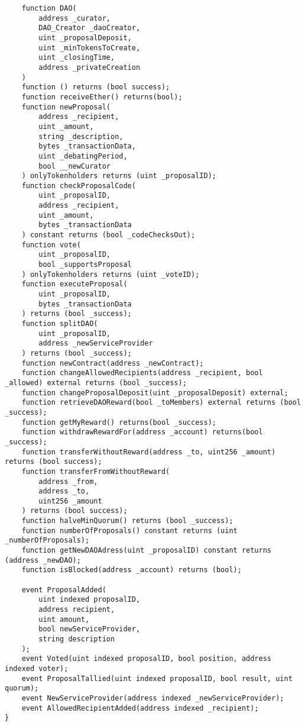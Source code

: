 \documentclass[9pt,oneside]{amsart}
\begin{document}
\begin{verbatim}
    function DAO(
        address _curator,
        DAO_Creator _daoCreator,
        uint _proposalDeposit,
        uint _minTokensToCreate,
        uint _closingTime,
        address _privateCreation
    )
    function () returns (bool success);
    function receiveEther() returns(bool);
    function newProposal(
        address _recipient,
        uint _amount,
        string _description,
        bytes _transactionData,
        uint _debatingPeriod,
        bool __newCurator
    ) onlyTokenholders returns (uint _proposalID);
    function checkProposalCode(
        uint _proposalID,
        address _recipient,
        uint _amount,
        bytes _transactionData
    ) constant returns (bool _codeChecksOut);
    function vote(
        uint _proposalID,
        bool _supportsProposal
    ) onlyTokenholders returns (uint _voteID);
    function executeProposal(
        uint _proposalID,
        bytes _transactionData
    ) returns (bool _success);
    function splitDAO(
        uint _proposalID,
        address _newServiceProvider
    ) returns (bool _success);
    function newContract(address _newContract);
    function changeAllowedRecipients(address _recipient, bool _allowed) external returns (bool _success);
    function changeProposalDeposit(uint _proposalDeposit) external;
    function retrieveDAOReward(bool _toMembers) external returns (bool _success);
    function getMyReward() returns(bool _success);
    function withdrawRewardFor(address _account) returns(bool _success);
    function transferWithoutReward(address _to, uint256 _amount) returns (bool success);
    function transferFromWithoutReward(
        address _from,
        address _to,
        uint256 _amount
    ) returns (bool success);
    function halveMinQuorum() returns (bool _success);
    function numberOfProposals() constant returns (uint _numberOfProposals);
    function getNewDAOAdress(uint _proposalID) constant returns (address _newDAO);
    function isBlocked(address _account) returns (bool);

    event ProposalAdded(
        uint indexed proposalID,
        address recipient,
        uint amount,
        bool newServiceProvider,
        string description
    );
    event Voted(uint indexed proposalID, bool position, address indexed voter);
    event ProposalTallied(uint indexed proposalID, bool result, uint quorum);
    event NewServiceProvider(address indexed _newServiceProvider);
    event AllowedRecipientAdded(address indexed _recipient);
}

\end{verbatim}
\end{document}
